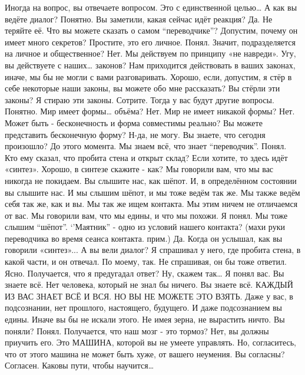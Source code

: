 \documentclass{extbook}
\newcommand{\soul}[1]{{#1}}
\newcommand{\people}[1]{{#1}}
\begin{document}
\people{Иногда на вопрос, вы отвечаете вопросом. Это с единственной целью…}
\soul{А как вы ведёте диалог?}
\people{Понятно.}
\soul{Вы заметили, какая сейчас идёт реакция?}
\people{Да.}
\soul{Не теряйте её.}
\people{Что вы можете сказать о самом ``переводчике''? Допустим, почему он имеет много секретов?}
\soul{Простите, это его личное.}
\people{Понял. Значит,  подразделяется на личное и общественное?}
\soul{Нет. Мы действуем по принципу «не навреди».}
\people{Угу, вы действуете с наших… законов?}
\soul{Нам приходится действовать в ваших законах, иначе, мы бы не могли с вами разговаривать.}
\people{Хорошо, если, допустим, я стёр в себе некоторые наши законы, вы можете обо мне рассказать?}
\soul{Вы стёрли эти законы?}
\people{Я стираю эти законы.}
\soul{Сотрите. Тогда у вас будут другие вопросы.}
\people{Понятно.  Мир имеет формы… объёма?}
\soul{Нет.}
\people{Мир не имеет  никакой формы?}
\soul{Нет. Может быть - бесконечность и форма совместимы реально? Вы можете представить бесконечную форму?}
\people{Н-да, не могу. Вы знаете, что сегодня произошло? До этого момента.}
\soul{Мы знаем всё, что знает ``переводчик''.}
\people{Понял. Кто ему сказал, что пробита стена и открыт склад? }
\soul{Если хотите, то здесь идёт «синтез».}
\people{Хорошо, в синтезе скажите - как?}
\soul{Мы говорили вам, что мы вас никогда не покидаем. Вы слышите нас, как шёпот. И, в определённом состоянии  вы слышите нас. И мы слышим шёпот, и мы тоже ведём так же. Мы также ведём себя так же, как и вы. Мы так же ищем контакта. Мы этим ничем не отличаемся от вас. Мы говорили вам, что мы едины, и что мы похожи.}
\people{Я понял.}
\soul{Мы тоже слышим ``шёпот''.}
\people{‘’Маятник'' - одно из условий нашего контакта? (махи руки переводчика во время сеанса контакта. прим.)}
\soul{Да.}
\people{Когда он услышал, как вы говорили «синтез»...}
\soul{А вы вели диалог?}
\people{Я спрашивал у него, где пробита стена, в какой части, и он отвечал. По моему, так.}
\soul{Не спрашивая, он бы тоже ответил.}
\people{Ясно. Получается, что я предугадал ответ? Ну, скажем так…}
\soul{Я понял вас. Вы знаете всё. Нет человека, который не знал бы ничего. Вы знаете всё. КАЖДЫЙ ИЗ ВАС ЗНАЕТ ВСЁ И ВСЯ. НО ВЫ НЕ МОЖЕТЕ ЭТО ВЗЯТЬ. Даже у вас, в подсознании, нет прошлого, настоящего, будущего. И даже подсознанием вы едины. Иначе вы бы не искали этого. Не имея зерна, не вырастить ничто. Вы поняли?}
\people{Понял. Получается, что наш мозг - это тормоз?}
\soul{Нет, вы должны приучить его. Это МАШИНА, которой вы не умеете управлять. Но, согласитесь, что от этого машина не может быть хуже, от вашего неумения. Вы согласны?}
\people{Согласен. Каковы пути, чтобы научится…}
\end{document}
